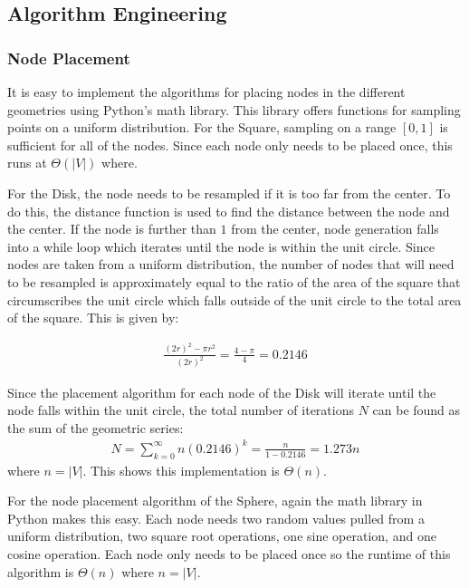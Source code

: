 \documentclass{article}
\begin{document}
    \subsection{Algorithm Engineering}

        \subsubsection{Node Placement}
        It is easy to implement the algorithms for placing nodes in the different geometries using Python's math library. This library offers functions for sampling points on a uniform distribution. For the Square, sampling on a range $[0,1]$ is sufficient for all of the nodes. Since each node only needs to be placed once, this runs at $\Theta(|V|)$ where.
        \par
        For the Disk, the node needs to be resampled if it is too far from the center. To do this, the distance function is used to find the distance between the node and the center. If the node is further than $1$ from the center, node generation falls into a while loop which iterates until the node is within the unit circle. Since nodes are taken from a uniform distribution, the number of nodes that will need to be resampled is approximately equal to the ratio of the area of the square that circumscribes the unit circle which falls outside of the unit circle to the total area of the square. This is given by:

        \begin{align}
            \frac{(2r)^2-\pi r^2}{(2r)^2} = \frac{4-\pi}{4} = 0.2146
        \end{align}

        Since the placement algorithm for each node of the Disk will iterate until the node falls within the unit circle, the total number of iterations $N$ can be found as the sum of the geometric series:
        \begin{align}
            N = \sum_{k=0}^{\infty} n (0.2146)^k = \frac{n}{1-0.2146} = 1.273n
        \end{align}
        where $n = |V|$. This shows this implementation is $\Theta\left(n\right)$.
        \par
        For the node placement algorithm of the Sphere, again the math library in Python makes this easy. Each node needs two random values pulled from a uniform distribution, two square root operations, one sine operation, and one cosine operation. Each node only needs to be placed once so the runtime of this algorithm is $\Theta(n)$ where $n = |V|$.
\end{document}
